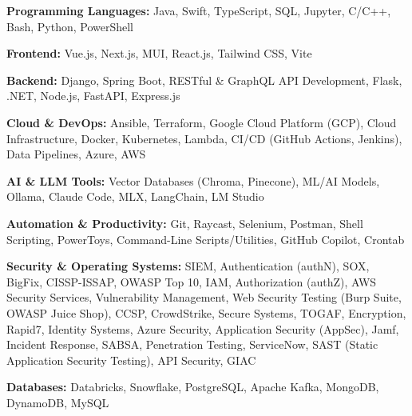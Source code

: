 \textbf{Programming Languages:} Java, Swift, TypeScript, SQL, Jupyter, C/C++, Bash, Python, PowerShell
\vspace{3pt}

\textbf{Frontend:} Vue.js, Next.js, MUI, React.js, Tailwind CSS, Vite
\vspace{3pt}

\textbf{Backend:} Django, Spring Boot, RESTful \& GraphQL API Development, Flask, .NET, Node.js, FastAPI, Express.js
\vspace{3pt}

\textbf{Cloud \& DevOps:} Ansible, Terraform, Google Cloud Platform (GCP), Cloud Infrastructure, Docker, Kubernetes, Lambda, CI/CD (GitHub Actions, Jenkins), Data Pipelines, Azure, AWS
\vspace{3pt}

\textbf{AI \& LLM Tools:} Vector Databases (Chroma, Pinecone), ML/AI Models, Ollama, Claude Code, MLX, LangChain, LM Studio
\vspace{3pt}

\textbf{Automation \& Productivity:} Git, Raycast, Selenium, Postman, Shell Scripting, PowerToys, Command-Line Scripts/Utilities, GitHub Copilot, Crontab
\vspace{3pt}

\textbf{Security \& Operating Systems:} SIEM, Authentication (authN), SOX, BigFix, CISSP-ISSAP, OWASP Top 10, IAM, Authorization (authZ), AWS Security Services, Vulnerability Management, Web Security Testing (Burp Suite, OWASP Juice Shop), CCSP, CrowdStrike, Secure Systems, TOGAF, Encryption, Rapid7, Identity Systems, Azure Security, Application Security (AppSec), Jamf, Incident Response, SABSA, Penetration Testing, ServiceNow, SAST (Static Application Security Testing), API Security, GIAC
\vspace{3pt}

\textbf{Databases:} Databricks, Snowflake, PostgreSQL, Apache Kafka, MongoDB, DynamoDB, MySQL